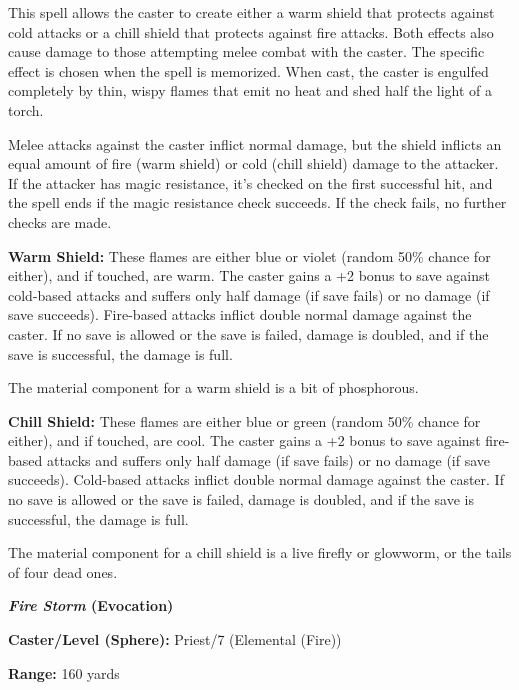 \begin{multicols}{2}
\begin{minipage}{\columnwidth}
\end{minipage}

This spell allows the caster to create either a warm shield that protects against cold attacks or a chill shield that protects against fire attacks.  Both effects also cause damage to those attempting melee combat with the caster.  The specific effect is chosen when the spell is memorized.  When cast, the caster is engulfed completely by thin, wispy flames that emit no heat and shed half the light of a torch.

Melee attacks against the caster inflict normal damage, but the shield inflicts an equal amount of fire (warm shield) or cold (chill shield) damage to the attacker.  If the attacker has magic resistance, it's checked on the first successful hit, and the spell ends if the magic resistance check succeeds.  If the check fails, no further checks are made.

\textbf{Warm Shield:}  These flames are either blue or violet (random 50\% chance for either), and if touched, are warm.  The caster gains a +2 bonus to save against cold-based attacks and suffers only half damage (if save fails) or no damage (if save succeeds).  Fire-based attacks inflict double normal damage against the caster.  If no save is allowed or the save is failed, damage is doubled, and if the save is successful, the damage is full.

The material component for a warm shield is a bit of phosphorous.

\textbf{Chill Shield:}  These flames are either blue or green (random 50\% chance for either), and if touched, are cool.  The caster gains a +2 bonus to save against fire-based attacks and suffers only half damage (if save fails) or no damage (if save succeeds).  Cold-based attacks inflict double normal damage against the caster.  If no save is allowed or the save is failed, damage is doubled, and if the save is successful, the damage is full.

The material component for a chill shield is a live firefly or glowworm, or the tails of four dead ones.

\vspace{1em}

\noindent
\begin{minipage}{\columnwidth}

\noindent \textbf{\textit{Fire Storm} (Evocation)}

\noindent \textbf{Caster/Level (Sphere):} Priest/7 (Elemental (Fire))

\noindent \textbf{Range:} 160 yards


\end{minipage}
\end{multicols}

